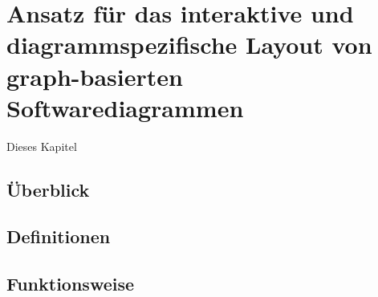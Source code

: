 
\chapter{Ansatz für das interaktive und diagrammspezifische Layout von graph-basierten Softwarediagrammen}
\label{chapter:interactive-approach}

Dieses Kapitel 

\section{Überblick}



\section{Definitionen}


\section{Funktionsweise}



